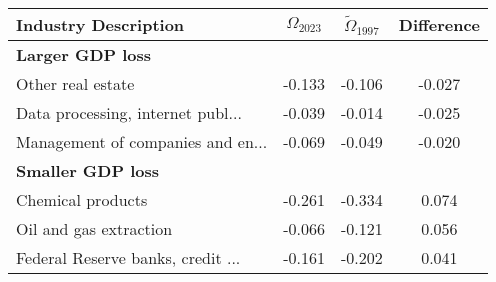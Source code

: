 \begin{tabular}{lccc}
\toprule
Industry Description & ${\Omega}_{2023}$ & $\tilde{\Omega}_{1997}$ & Difference \\
\midrule
\midrule
\multicolumn{2}{l}{\textbf{Larger GDP loss}} \\
\midrule
Other real estate & -0.133 & -0.106 & -0.027 \\
Data processing, internet publ... & -0.039 & -0.014 & -0.025 \\
Management of companies and en... & -0.069 & -0.049 & -0.020 \\
\midrule
\multicolumn{2}{l}{\textbf{Smaller GDP loss}} \\
\midrule
Chemical products & -0.261 & -0.334 & 0.074 \\
Oil and gas extraction & -0.066 & -0.121 & 0.056 \\
Federal Reserve banks, credit ... & -0.161 & -0.202 & 0.041 \\
\bottomrule
\end{tabular}